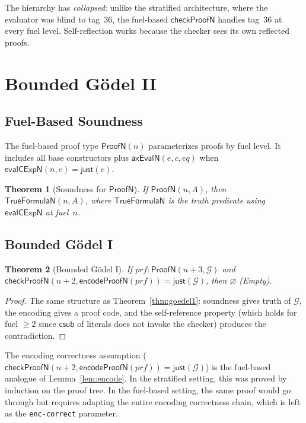 \documentclass[11pt]{article}
\newtheorem{theorem}{Theorem}[section]
\newcommand{\ProofN}{\mathsf{ProofN}}
\newcommand{\evalCExpN}{\mathsf{evalCExpN}}
\newcommand{\checkProofN}{\mathsf{checkProofN}}
\newcommand{\csub}{\mathsf{csub}}
\newcommand{\GS}{\mathcal{G}}
\begin{document}
The hierarchy has \emph{collapsed}: unlike the stratified architecture,
where the evaluator was blind to tag~36, the fuel-based $\checkProofN$
handles tag~36 at every fuel level. Self-reflection works because the
checker sees its own reflected proofs.

\section{Bounded G\"odel II}
\label{sec:goedel2}

\subsection{Fuel-Based Soundness}

The fuel-based proof type $\ProofN(n)$ parameterizes proofs by fuel
level. It includes all base constructors plus $\mathsf{axEvalN}(e, c, \mathit{eq})$
when $\evalCExpN(n, e) = \mathsf{just}(c)$.

\begin{theorem}[Soundness for $\ProofN$]
  \label{thm:soundN}
  If $\ProofN(n, A)$, then $\mathsf{TrueFormulaN}(n, A)$, where
  $\mathsf{TrueFormulaN}$ is the truth predicate using $\evalCExpN$ at
  fuel~$n$.
\end{theorem}

\subsection{Bounded G\"odel I}

\begin{theorem}[Bounded G\"odel I]
  \label{thm:goedel1fuel}
  If\/ $\mathit{prf} : \ProofN(n{+}3, \GS)$ and
  $\checkProofN(n{+}2, \mathsf{encodeProofN}(\mathit{prf}))
    = \mathsf{just}(\GS)$,
  then $\varnothing$ (Empty).
\end{theorem}

\begin{proof}
  The same structure as Theorem~\ref{thm:goedel1}: soundness gives
  truth of $\GS$, the encoding gives a proof code, and the self-reference
  property (which holds for fuel $\geq 2$ since $\csub$ of literals
  does not invoke the checker) produces the contradiction.
\end{proof}

The encoding correctness assumption
($\checkProofN(n{+}2, \mathsf{encodeProofN}(\mathit{prf})) = \mathsf{just}(\GS)$)
is the fuel-based analogue of Lemma~\ref{lem:encode}. In the stratified
setting, this was proved by induction on the proof tree. In the
fuel-based setting, the same proof would go through but requires
adapting the entire encoding correctness chain, which is left as the
\texttt{enc-correct} parameter.
\end{document}

